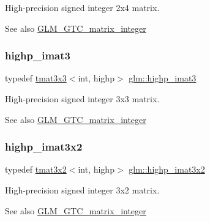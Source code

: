 High-\/precision signed integer 2x4 matrix. \begin{DoxySeeAlso}{See also}
\hyperlink{group__gtc__matrix__integer}{G\+L\+M\+\_\+\+G\+T\+C\+\_\+matrix\+\_\+integer} 
\end{DoxySeeAlso}
\mbox{\label{group__gtc__matrix__integer_ga0766d11d0154f42893ef0912ab7c6a2c}} 
\subsubsection{\texorpdfstring{highp\+\_\+imat3}{highp\_imat3}}
{\footnotesize\ttfamily typedef \hyperlink{structglm_1_1tmat3x3}{tmat3x3}$<$int, highp$>$ \hyperlink{group__gtc__matrix__integer_ga0766d11d0154f42893ef0912ab7c6a2c}{glm\+::highp\+\_\+imat3}}

High-\/precision signed integer 3x3 matrix. \begin{DoxySeeAlso}{See also}
\hyperlink{group__gtc__matrix__integer}{G\+L\+M\+\_\+\+G\+T\+C\+\_\+matrix\+\_\+integer} 
\end{DoxySeeAlso}
\mbox{\label{group__gtc__matrix__integer_ga2c8dc817124f44bc01f27777bfce983b}} 
\subsubsection{\texorpdfstring{highp\+\_\+imat3x2}{highp\_imat3x2}}
{\footnotesize\ttfamily typedef \hyperlink{structglm_1_1tmat3x2}{tmat3x2}$<$int, highp$>$ \hyperlink{group__gtc__matrix__integer_ga2c8dc817124f44bc01f27777bfce983b}{glm\+::highp\+\_\+imat3x2}}

High-\/precision signed integer 3x2 matrix. \begin{DoxySeeAlso}{See also}
\hyperlink{group__gtc__matrix__integer}{G\+L\+M\+\_\+\+G\+T\+C\+\_\+matrix\+\_\+integer} 
\end{DoxySeeAlso}
\mbox{\label{group__gtc__matrix__integer_gaecb62c11fb25aadbb7eecc2da226d444}} 
